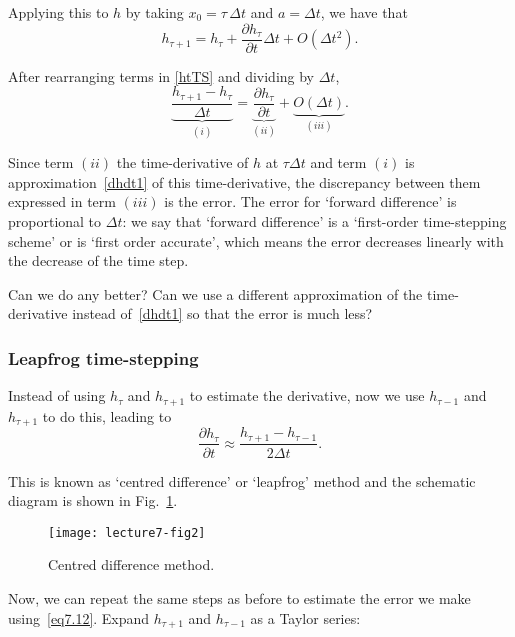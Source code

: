 Applying this to $h$ by taking $x_0=\tau\,\Delta t$ and $a=\Delta t$, we have that
\begin{equation}
h_{\tau+1}=h_{\tau}+\frac{\partial h_{\tau}}{\partial t}\Delta t + O(\Delta t^{2}).
\label{htTS}
\end{equation}

After rearranging terms in \eqref{htTS} and dividing by $\Delta t$,
\begin{equation}
\underbrace{\frac{h_{\tau+1}-h_{\tau}}{\Delta t}}_{(i)}=\underbrace{\frac{\partial h_{\tau}}{\partial t}}_{(ii)} + \underbrace{O(\Delta t)}_{(iii)}.
\label{FOA}
\end{equation}


Since term $(ii)$ the time-derivative of $h$ at $\tau\Delta t$ and term $(i)$ is approximation~\eqref{dhdt1} of this time-derivative, the discrepancy between them expressed in term $(iii)$ is the error. The error for `forward difference' is proportional to $\Delta t$: we say that `forward difference' is a `first-order time-stepping scheme' or is `first order accurate', which means the error decreases linearly with the decrease of the time step. 

Can we do any better? Can we use a different approximation of the time-derivative instead of~\eqref{dhdt1} so that the error is much less?

\subsubsection*{Leapfrog time-stepping}


Instead of using $h_{\tau}$ and $h_{\tau+1}$ to estimate  the derivative, now we use $h_{\tau-1}$ and $h_{\tau+1}$ to do this, leading to 
\begin{equation}
\frac{\partial h_{\tau}}{\partial t}\approx\frac{h_{\tau+1}-h_{\tau-1}}{2\Delta t}.\label{eq7.12}
\end{equation}

This is known as `centred difference' or `leapfrog' method and the schematic diagram is shown in Fig.~\ref{CDdiagram}.
\begin{figure}[h!]
\centering
\texttt{[image: lecture7-fig2]}
\caption{Centred difference method.}
\label{CDdiagram}
\end{figure}

Now, we can repeat the same steps as before to estimate the error we make using~\eqref{eq7.12}. Expand $h_{\tau+1}$ and $h_{\tau-1}$ as a Taylor series:

